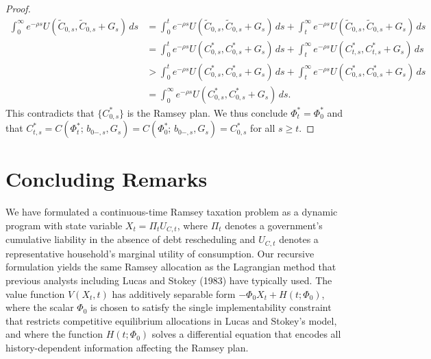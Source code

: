 \documentclass[12pt]{article}
\begin{document}
{\begin{proof}
	\begin{align*}
	\int_0^\infty e^{-\rho s} U(\widetilde{C}_{0,s}, \widetilde{C}_{0,s}+G_s)\, ds &= \int_0^t e^{-\rho s} U(\widetilde{C}_{0,s}, \widetilde{C}_{0,s}+G_s)\, ds + \int_t^\infty e^{-\rho s} U(\widetilde{C}_{0,s}, \widetilde{C}_{0,s}+G_s)\, ds \\
	&= \int_0^t e^{-\rho s} U(C_{0,s}^*, C_{0,s}^*+G_s)\, ds + \int_t^\infty e^{-\rho s} U(C_{t,s}^*, C_{t,s}^*+G_s)\, ds \\
	&> \int_0^t e^{-\rho s} U(C_{0,s}^*, C_{0,s}^*+G_s)\, ds + \int_t^\infty e^{-\rho s} U(C_{0,s}^*, C_{0,s}^*+G_s)\, ds \\
	&= \int_0^\infty e^{-\rho s} U(C_{0,s}^*, C_{0,s}^*+G_s)\, ds.
	\end{align*}
	This contradicts that $\{C_{0,s}^*\}$ is the Ramsey plan. We thus conclude $\Phi_t^* = \Phi_0^*$ and  that $C_{t,s}^* = C(\Phi_t^*;\, b_{0-,s}, G_s) = C(\Phi_0^*;\, b_{0-,s}, G_s) = C_{0,s}^*$ for all $s \ge t$.
\end{proof}

\section{Concluding Remarks}\label{sec:conclude}
%
{We have formulated a continuous-time Ramsey taxation problem as a dynamic program with state variable $X_t = \Pi_t U_{C,t}$, where $\Pi_t$ denotes a government's cumulative liability in the absence of debt rescheduling and $U_{C,t}$ denotes a representative household's  marginal utility of consumption. Our recursive formulation yields the same Ramsey allocation as the Lagrangian method that   previous analysts including Lucas and Stokey (1983) have typically used. The value function $V(X_t,t)$ 
has additively separable form $  -\Phi_0 X_t + H(t;\Phi_0)$, where the scalar $\Phi_0$ is chosen to satisfy the single implementability constraint that restricts competitive equilibrium allocations in Lucas and Stokey's model, and where the function  $H(t;\Phi_0)$ solves a differential equation that encodes all  history-dependent  information affecting the Ramsey plan. }%


}
\end{document}
